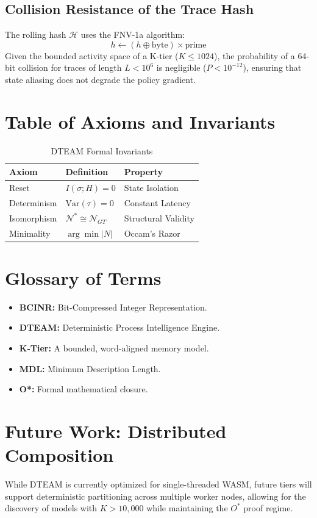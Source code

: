 \documentclass[12pt,a4paper]{report}
\begin{document}
\section{Collision Resistance of the Trace Hash}
The rolling hash $\mathcal{H}$ uses the FNV-1a algorithm:
\begin{equation}
h \leftarrow (h \oplus \text{byte}) \times \text{prime}
\end{equation}
Given the bounded activity space of a K-tier ($K \leq 1024$), the probability of a 64-bit collision for traces of length $L < 10^6$ is negligible ($P < 10^{-12}$), ensuring that state aliasing does not degrade the policy gradient.

\chapter{Table of Axioms and Invariants}
\begin{table}[ht]
\centering
\caption{DTEAM Formal Invariants}
\begin{tabular}{lll}
\toprule
Axiom & Definition & Property \\
\midrule
Reset & $I(\sigma; H) = 0$ & State Isolation \\
Determinism & $\text{Var}(\tau) = 0$ & Constant Latency \\
Isomorphism & $\mathcal{N}^* \cong \mathcal{N}_{GT}$ & Structural Validity \\
Minimality & $\arg\min |N|$ & Occam's Razor \\
\bottomrule
\end{tabular}
\end{table}

\chapter{Glossary of Terms}
\begin{itemize}
    \item \textbf{BCINR:} Bit-Compressed Integer Representation.
    \item \textbf{DTEAM:} Deterministic Process Intelligence Engine.
    \item \textbf{K-Tier:} A bounded, word-aligned memory model.
    \item \textbf{MDL:} Minimum Description Length.
    \item \textbf{O*:} Formal mathematical closure.
\end{itemize}

\chapter{Future Work: Distributed Composition}
While DTEAM is currently optimized for single-threaded WASM, future tiers will support deterministic partitioning across multiple worker nodes, allowing for the discovery of models with $K > 10,000$ while maintaining the $O^*$ proof regime.
\end{document}
